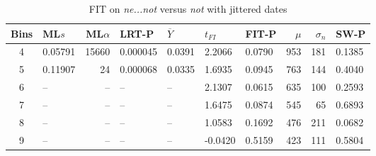 \begin{table}[ht]
\centering
\begin{tabular}{c  l  r  l  l  l  l   r  r  l  }
  \hline
Bins & ML$s$ & ML$\alpha$ & LRT-P & $\overline{Y}$ & $t_{FI}$ & FIT-P & $\mu$ & $\sigma_n$ & SW-P \\ 
  \hline
  4 & 0.05791 & 15660 & 0.000045 & 0.0391 & 2.2066 & 0.0790 & 953 & 181 & 0.1385 \\ 
  5 & 0.11907 & 24 & 0.000068 & 0.0335 & 1.6935 & 0.0945 & 763 & 144 & 0.4040 \\ 
  6 & -- & -- & -- & -- & 2.1307 & 0.0615 & 635 & 100 & 0.2593 \\ 
  7 & -- & -- & -- & -- & 1.6475 & 0.0874 & 545 & 65 & 0.6893 \\ 
  8 & -- & -- & -- & -- & 1.0583 & 0.1692 & 476 & 211 & 0.0682 \\ 
  9 & -- & -- & -- & -- & -0.0420 & 0.5159 & 423 & 111 & 0.5804 \\   \hline
  \end{tabular}
\caption{FIT on \textit{\color{blue} ne...not} versus  \textit{\color{green} not} with jittered dates}
\label{jitter-split-table2}
\end{table}



